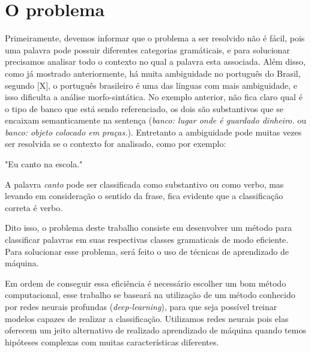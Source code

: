 \chapter{O problema}\label{problema}

Primeiramente, devemos informar que o problema a ser resolvido não é fácil, pois uma palavra pode possuir diferentes categorias gramáticais, e para solucionar precisamos analisar todo o contexto no qual a palavra esta associada. Além disso, como já mostrado anteriormente, há muita ambiguidade no português do Brasil, segundo [X], o português brasileiro é uma das línguas com mais ambiguidade, e isso dificulta a análise morfo-sintática. No exemplo anterior, não fica claro qual é o tipo de banco que está sendo referenciado, os dois são substantivos que se encaixam semanticamente na sentença (\textit{banco: lugar onde é guardado dinheiro.} ou \textit{banco: objeto colocado em praças.}). Entretanto a ambiguidade pode muitas vezes ser resolvida se o contexto for analisado, como por exemplo:

\begin{center}
"Eu canto na escola."
\end{center}

A palavra \textit{canto} pode ser classificada como substantivo ou como verbo, mas levando em consideração o sentido da frase, fica evidente que a classificação correta é verbo.

Dito isso, o problema deste trabalho consiste em desenvolver um método para classificar palavras em suas respectivas classes gramaticais de modo eficiente. Para solucionar esse problema, será feito o uso de técnicas de aprendizado de máquina.

Em ordem de conseguir essa eficiência é necessário escolher um bom método computacional, esse trabalho se baseará na utilização de um método conhecido por redes neurais profundas (\textit{deep-learning}), para que seja possível treinar modelos capazes de realizar a classificação. Utilizamos redes neurais pois elas oferecem um jeito alternativo de realizado aprendizado de máquina quando temos hipóteses complexas com muitas características diferentes.

